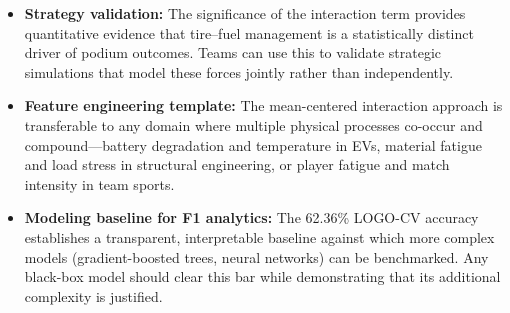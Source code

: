 \begin{itemize}
  \item \textbf{Strategy validation:} The significance of the interaction term
    provides quantitative evidence that tire--fuel management is a
    statistically distinct driver of podium outcomes. Teams can use this to
    validate strategic simulations that model these forces jointly rather than
    independently.

  \item \textbf{Feature engineering template:} The mean-centered interaction
    approach is transferable to any domain where multiple physical processes
    co-occur and compound---battery degradation and temperature in EVs,
    material fatigue and load stress in structural engineering, or player
    fatigue and match intensity in team sports.

  \item \textbf{Modeling baseline for F1 analytics:} The 62.36\% LOGO-CV
    accuracy establishes a transparent, interpretable baseline against which
    more complex models (gradient-boosted trees, neural networks) can be
    benchmarked. Any black-box model should clear this bar while demonstrating
    that its additional complexity is justified.
\end{itemize}
